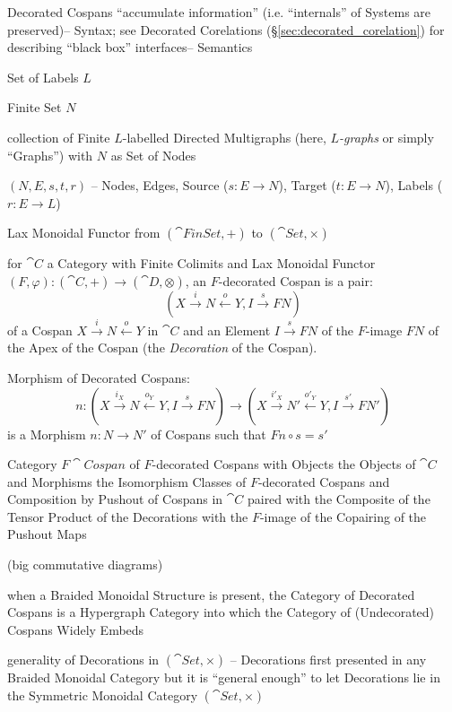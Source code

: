 Decorated Cospans ``accumulate information'' (i.e. ``internals'' of
Systems are preserved)-- Syntax; see Decorated Corelations
(\S\ref{sec:decorated_corelation}) for describing ``black box''
interfaces-- Semantics

Set of Labels $L$

Finite Set $N$

collection of Finite $L$-labelled Directed Multigraphs (here,
\emph{$L$-graphs} or simply ``Graphs'') with $N$ as Set of Nodes

$(N,E,s,t,r)$ -- Nodes, Edges, Source ($s : E \rightarrow N$), Target
($t : E \rightarrow N$), Labels ($r : E \rightarrow L$)

Lax Monoidal Functor from $(\cat{FinSet},+)$ to $(\cat{Set}, \times)$


for $\cat{C}$ a Category with Finite Colimits and Lax Monoidal Functor
$(F, \varphi) : (\cat{C}, +) \rightarrow (\cat{D}, \otimes)$, an
$F$-decorated Cospan is a pair:
\[
  (X \xrightarrow{i} N \xleftarrow{o} Y, I \xrightarrow{s} F N)
\]
of a Cospan $X \xrightarrow{i} N \xleftarrow{o} Y$ in $\cat{C}$ and an
Element $I \xrightarrow{s} F N$ of the $F$-image $F N$ of the Apex of
the Cospan (the \emph{Decoration} of the Cospan).

Morphism of Decorated Cospans:
\[
  n: (X \xrightarrow{i_X} N \xleftarrow{o_Y} Y, I \xrightarrow{s} F N)
    \rightarrow (X \xrightarrow{i'_X} N' \xleftarrow{o'_Y} Y,
      I \xrightarrow{s'} F N')
\]
is a Morphism $n : N \rightarrow N'$ of Cospans such that $F n \circ s
= s'$

Category $F\cat{Cospan}$ of $F$-decorated Cospans with Objects the
Objects of $\cat{C}$ and Morphisms the Isomorphism Classes of
$F$-decorated Cospans and Composition by Pushout of Cospans in
$\cat{C}$ paired with the Composite of the Tensor Product of the
Decorations with the $F$-image of the Copairing of the Pushout Maps

(big commutative diagrams) %

when a Braided Monoidal Structure is present, the Category of
Decorated Cospans is a Hypergraph Category into which the Category of
(Undecorated) Cospans Widely Embeds

generality of Decorations in $(\cat{Set}, \times)$ -- Decorations
first presented in any Braided Monoidal Category but it is ``general
enough'' to let Decorations lie in the Symmetric Monoidal Category
$(\cat{Set}, \times)$ %

